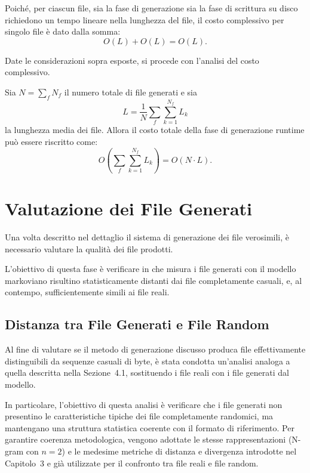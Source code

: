 \documentclass{report}
\begin{document}
\bigskip

Poiché, per ciascun file, sia la fase di generazione sia la fase
di scrittura su disco richiedono un tempo lineare nella lunghezza del file,
il costo complessivo per singolo file è dato dalla somma:
\[
O(L) + O(L) = O(L).
\]


Date le considerazioni sopra esposte, si procede con l'analisi del costo complessivo.

Sia \(N = \sum_f N_f\) il numero totale di file generati e sia
\[
L = \frac{1}{N} \sum_f \sum_{k=1}^{N_f} L_k
\]
la lunghezza media dei file.
Allora il costo totale della fase di generazione runtime può essere riscritto come:
\[
O\!\left( \sum_f \sum_{k=1}^{N_f} L_k \right)
=
O(N \cdot L).
\]





\section{Valutazione dei File Generati}

Una volta descritto nel dettaglio il sistema di generazione dei file verosimili,
è necessario valutare la qualità dei file prodotti.

\bigskip

L'obiettivo di questa fase è verificare in che misura i file generati
con il modello markoviano risultino statisticamente distanti dai file completamente casuali, e, al contempo,
sufficientemente simili ai file reali.

\subsection{Distanza tra File Generati e File Random}

Al fine di valutare se il metodo di generazione discusso produca file effettivamente 
distinguibili da sequenze casuali di byte, è stata condotta un'analisi analoga a quella descritta
nella Sezione~4.1, sostituendo i file reali con i file generati dal modello.

\bigskip

In particolare, l’obiettivo di questa analisi è verificare che i file generati
non presentino le caratteristiche tipiche dei file completamente randomici,
ma mantengano una struttura statistica coerente con il formato di riferimento.
Per garantire coerenza metodologica, vengono adottate le stesse rappresentazioni
(N-gram con $n=2$) e le medesime metriche di distanza e divergenza introdotte
nel Capitolo~3 e già utilizzate per il confronto tra file reali e file random.
\end{document}
